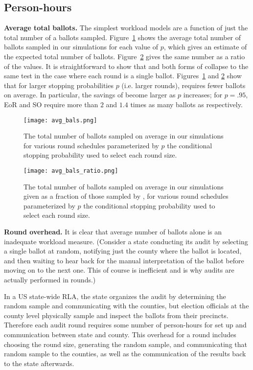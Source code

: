 \subsection{Person-hours}

\noindent\textbf{Average total ballots.} 
The simplest workload models are a function of just the total number of a ballots sampled. Figure~\ref{fig:avg_bals} shows the average total number of ballots sampled in our simulations for each value of $p$, which gives an estimate of the expected total number of ballots.
Figure~\ref{fig:avg_bals_ratio} gives the same number as a ratio of the \Providence values.
It is straightforward to show that \Providence and both forms of \BRAVO collapse to the same test in the case where each round is a single ballot. Figures~\ref{fig:avg_bals} and \ref{fig:avg_bals_ratio} show that for larger stopping probabilities $p$ (i.e. larger rounds), \Providence requires fewer ballots on average. In particular, the savings of \Providence become larger as $p$ increases; for $p=.95$, EoR \BRAVO and SO \BRAVO require more than $2$ and $1.4$ times as many ballots as \Providence respectively. 

\begin{figure}
\texttt{[image: avg\_bals.png]}
\caption{The total number of ballots sampled on average in our simulations for various round schedules parameterized by $p$ the conditional stopping probability used to select each round size.}
\label{fig:avg_bals}
\end{figure}

\begin{figure}
\texttt{[image: avg\_bals\_ratio.png]}
\caption{The total number of ballots sampled on average in our simulations given as a fraction of those sampled by \Providence, for various round schedules parameterized by $p$ the conditional stopping probability used to select each round size.}
\label{fig:avg_bals_ratio}
\end{figure}


\noindent\textbf{Round overhead.} 
It is clear that average number of ballots alone is an inadequate workload measure. 
(Consider a state conducting its audit by selecting a single ballot at random, 
notifying just the county where the ballot is located, and then waiting to hear back for the manual interpretation of the ballot before moving on to the next one. 
This of course is inefficient and is why audits are actually performed in rounds.)

In a US state-wide RLA, the state organizes the audit by determining the random sample and communicating with the counties, but election officials at the county level physically sample and inspect the ballots from their precincts. 
Therefore each audit round requires some number of person-hours for set up and communication between state and county. This overhead for a round includes choosing the round size, generating the random sample, and communicating that random sample to the counties, as well as the communication of the results back to the state afterwards. 

